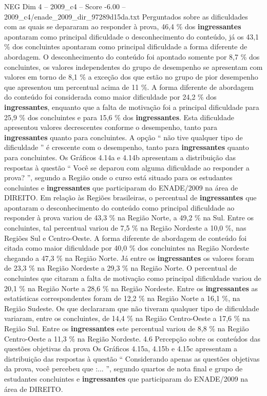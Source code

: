 \begin{textsample}{NEG Dim 4 – 2009\_c4 – Score -6.00 – 2009\_c4/enade\_2009\_dir\_97289d15da.txt}
Perguntados sobre as dificuldades com as quais se depararam ao responder à prova, 46,4 \% dos \textbf{ingressantes} apontaram como principal dificuldade o desconhecimento do conteúdo, já os 43,1 \% dos concluintes apontaram como principal dificuldade a forma diferente de abordagem.
O desconhecimento do conteúdo foi apontado somente por 8,7 \% dos concluintes, os valores independentes do grupo de desempenho se apresentam com valores em torno de 8,1 \% a exceção dos que estão no grupo de pior desempenho que apresentou um percentual acima de 11 \%.
A forma diferente de abordagem do conteúdo foi considerada como maior dificuldade por 24,2 \% dos \textbf{ingressantes}, enquanto que a falta de motivação foi a principal dificuldade para 25,9 \% dos concluintes e para 15,6 \% dos \textbf{ingressantes}.
Esta dificuldade apresentou valores decrescentes conforme o desempenho, tanto para \textbf{ingressantes} quanto para concluintes.
A opção “ não tive qualquer tipo de dificuldade ” é crescente com o desempenho, tanto para \textbf{ingressantes} quanto para concluintes.
Os Gráficos 4.14a e 4.14b apresentam a distribuição das respostas à questão “ Você se deparou com alguma dificuldade ao responder a prova? ”, segundo a Região onde o curso está situado para os estudantes concluintes e \textbf{ingressantes} que participaram do ENADE/2009 na área de DIREITO.
Em relação às Regiões brasileiras, o percentual de \textbf{ingressantes} que apontaram o desconhecimento do conteúdo como principal dificuldade ao responder à prova variou de 43,3 \% na Região Norte, a 49,2 \% na Sul.
Entre os concluintes, tal percentual variou de 7,5 \% na Região Nordeste a 10,0 \%, nas Regiões Sul e Centro-Oeste.
A forma diferente de abordagem de conteúdo foi citada como maior dificuldade por 40,0 \% dos concluintes na Região Nordeste chegando a 47,3 \% na Região Norte.
Já entre os \textbf{ingressantes} os valores foram de 23,3 \% na Região Nordeste a 29,3 \% na Região Norte.
O percentual de concluintes que citaram a falta de motivação como principal dificuldade variou de 20,1 \% na Região Norte a 28,6 \% na Região Nordeste.
Entre os \textbf{ingressantes} as estatísticas correspondentes foram de 12,2 \% na Região Norte a 16,1 \%, na Região Sudeste.
Os que declararam que não tiveram qualquer tipo de dificuldade variaram, entre os concluintes, de 14,4 \% na Região Centro-Oeste a 17,6 \% na Região Sul.
Entre os \textbf{ingressantes} este percentual variou de 8,8 \% na Região Centro-Oeste a 11,3 \% na Região Nordeste. 4.6 Percepção sobre os conteúdos das questões objetivas da prova Os Gráficos 4.15a, 4.15b e 4.15c apresentam a distribuição das respostas à questão “ Considerando apenas as questões objetivas da prova, você percebeu que :... ”, segundo quartos de nota final e grupo de estudantes concluintes e \textbf{ingressantes} que participaram do ENADE/2009 na área de DIREITO.

\end{textsample}
